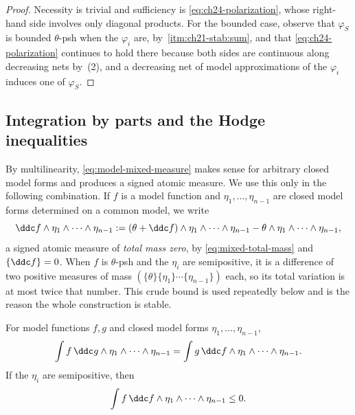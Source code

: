 \begin{proof}
Necessity is trivial and sufficiency is \eqref{eq:ch24-polarization}, whose
right-hand side involves only diagonal products.  For the bounded case,
observe that \(\varphi_S\) is bounded \(\theta\)-psh when the \(\varphi_i\)
are, by \,\cref{itm:ch21-stab:sum}, and that
\eqref{eq:ch24-polarization} continues to hold there because both sides are
continuous along decreasing nets by
\,(2), and a decreasing net of model
approximations of the \(\varphi_i\) induces one of \(\varphi_S\).
\end{proof}

\subsection{Integration by parts and the Hodge inequalities}
\label{sec:ch24-model-ibp}

By multilinearity, \eqref{eq:model-mixed-measure} makes sense for arbitrary
closed model forms and produces a signed atomic measure.  We use this only
in the following combination.  If \(f\) is a model function and
\(\eta_1,\ldots,\eta_{n-1}\) are closed model forms determined on a common
model, we write
\[
 \ddc f\wedge\eta_1\wedge\cdots\wedge\eta_{n-1}
 :=(\theta+\ddc f)\wedge\eta_1\wedge\cdots\wedge\eta_{n-1}
   -\theta\wedge\eta_1\wedge\cdots\wedge\eta_{n-1},
\]
a signed atomic measure of \emph{total mass zero}, by
\eqref{eq:mixed-total-mass} and \(\{\ddc f\}=0\).  When \(f\) is
\(\theta\)-psh and the \(\eta_i\) are semipositive, it is a difference of
two positive measures of mass \((\{\theta\}\{\eta_1\}\cdots\{\eta_{n-1}\})\)
each, so its total variation is at most twice that number.  This crude bound
is used repeatedly below and is the reason the whole construction is stable.

\begin{proposition}\label{prop:model-integration-by-parts}
For model functions \(f,g\) and closed model forms
\(\eta_1,\ldots,\eta_{n-1}\),
\begin{equation}
\label{eq:model-ibp}
 \int f\,\ddc g\wedge\eta_1\wedge\cdots\wedge\eta_{n-1}
 =\int g\,\ddc f\wedge\eta_1\wedge\cdots\wedge\eta_{n-1}.
\end{equation}
If the \(\eta_i\) are semipositive, then
\begin{equation}
\label{eq:model-dirichlet-negativity}
 \int f\,\ddc f\wedge\eta_1\wedge\cdots\wedge\eta_{n-1}\leq0.
\end{equation}
\end{proposition}

